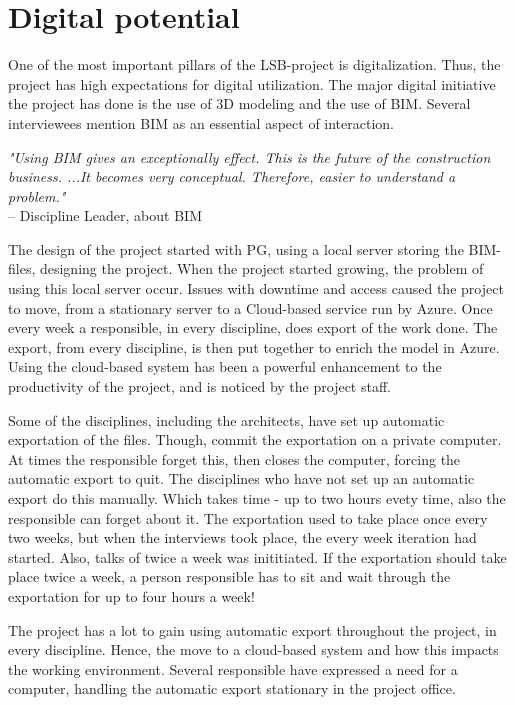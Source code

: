 \section{Digital potential} \label{sec:digital_potential}
One of the most important pillars of the LSB-project is digitalization. Thus, the project has high expectations for digital utilization. The major digital initiative the project has done is the use of 3D modeling and the use of BIM. Several interviewees mention BIM as an essential aspect of interaction. 

\textit{"Using BIM gives an exceptionally effect. This is the future of the construction business. ...It becomes very conceptual. Therefore, easier to understand a problem."} \\
– Discipline Leader, about BIM

The design of the project started with PG, using a local server storing the BIM-files, designing the project. When the project started growing, the problem of using this local server occur. Issues with downtime and access caused the project to move, from a stationary server to a Cloud-based service run by Azure. Once every week a responsible, in every discipline, does export of the work done. The export, from every discipline, is then put together to enrich the model in Azure. Using the cloud-based system has been a powerful enhancement to the productivity of the project, and is noticed by the project staff. 

Some of the disciplines, including the architects, have set up automatic exportation of the files. Though, commit the exportation on a private computer. At times the responsible forget this, then closes the computer, forcing the automatic export to quit. The disciplines who have not set up an automatic export do this manually. Which takes time - up to two hours evety time, also the responsible can forget about it. The exportation used to take place once every two weeks, but when the interviews took place, the every week iteration had started. Also, talks of twice a week was inititiated. If the exportation should take place twice a week, a person responsible has to sit and wait through the exportation for up to four hours a week!

The project has a lot to gain using automatic export throughout the project, in every discipline. Hence, the move to a cloud-based system and how this impacts the working environment. Several responsible have expressed a need for a computer, handling the automatic export stationary in the project office. 

